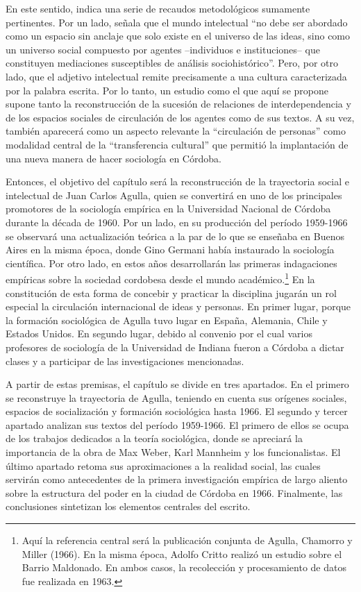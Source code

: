 En este sentido, \textcite[31]{1510-SAPIRO2017} indica una serie de recaudos metodológicos sumamente pertinentes. Por un lado, señala que el mundo intelectual \enquote{no debe ser abordado como un espacio sin anclaje que solo existe en el universo de las ideas, sino como un universo social compuesto por agentes --individuos e instituciones-- que constituyen mediaciones susceptibles de análisis sociohistórico}. Pero, por otro lado, que el adjetivo intelectual remite precisamente a una cultura caracterizada por la palabra escrita. Por lo tanto, un estudio como el que aquí se propone supone tanto la reconstrucción de la sucesión de relaciones de interdependencia y de los espacios sociales de circulación de los agentes como de sus textos. A su vez, también aparecerá como un aspecto relevante la \enquote{circulación de personas} \parencite[35]{1510-SAPIRO2017} como modalidad central de la \enquote{transferencia cultural} que permitió la implantación de una nueva manera de hacer sociología en Córdoba.

Entonces, el objetivo del capítulo será la reconstrucción de la trayectoria social e intelectual de Juan Carlos Agulla, quien se convertirá en uno de los principales promotores de la sociología empírica en la Universidad Nacional de Córdoba durante la década de 1960. Por un lado, en su producción del período 1959-1966 se observará una actualización teórica a la par de lo que se enseñaba en Buenos Aires en la misma época, donde Gino Germani había instaurado la sociología científica. Por otro lado, en estos años desarrollarán las primeras indagaciones empíricas sobre la sociedad cordobesa desde el mundo académico.\footnote{Aquí la referencia central será la publicación conjunta de Agulla, Chamorro y Miller (1966). En la misma época, Adolfo Critto realizó un estudio sobre el Barrio Maldonado. En ambos casos, la recolección y procesamiento de datos fue realizada en 1963.} En la constitución de esta forma de concebir y practicar la disciplina jugarán un rol especial la circulación internacional de ideas y personas. En primer lugar, porque la formación sociológica de Agulla tuvo lugar en España, Alemania, Chile y Estados Unidos. En segundo lugar, debido al convenio por el cual varios profesores de sociología de la Universidad de Indiana fueron a Córdoba a dictar clases y a participar de las investigaciones mencionadas.

A partir de estas premisas, el capítulo se divide en tres apartados. En el primero se reconstruye la trayectoria de Agulla, teniendo en cuenta sus orígenes sociales, espacios de socialización y formación sociológica hasta 1966. El segundo y tercer apartado analizan sus textos del período 1959-1966. El primero de ellos se ocupa de los trabajos dedicados a la teoría sociológica, donde se apreciará la importancia de la obra de Max Weber, Karl Mannheim y los funcionalistas. El último apartado retoma sus aproximaciones a la realidad social, las cuales servirán como antecedentes de la primera investigación empírica de largo aliento sobre la estructura del poder en la ciudad de Córdoba en 1966. Finalmente, las conclusiones sintetizan los elementos centrales del escrito.

